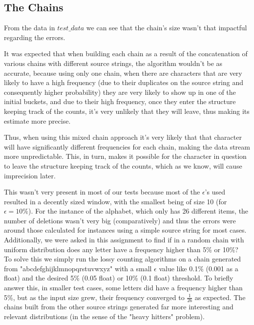 \documentclass[...]{revdetua}
\begin{document}
\subsection{The Chains}
From the data in $test\_data$ we can see that the chain's size wasn't that impactful regarding the errors.\par
It was expected that when building each chain as a result of the concatenation of various chains with different source strings, the algorithm wouldn't be as accurate, because using only one chain, when there are characters that are very likely to have a high frequency (due to their duplicates on the source string and consequently higher probability) they are very likely to show up in one of the initial buckets, and due to their high frequency, once they enter the structure keeping track of the counts, it's very unlikely that they will leave, thus making its estimate more precise.\par 
Thus, when using this mixed chain approach it's very likely that that character will have significantly different frequencies for each chain, making the data stream more unpredictable. This, in turn, makes it possible for the character in question to leave the structure keeping track of the counts, which as we know, will cause imprecision later.\par
This wasn't very present in most of our tests because most of the $\epsilon$'s used resulted in a decently sized window, with the smallest being of size 10 (for $\epsilon=10\%$). For the instance of the alphabet, which only has 26 different items, the number of deletions wasn't very big (comparatively) and thus the errors were around those calculated for instances using  a simple source string for most cases.\\
Additionally, we were asked in this assignment to find if in a random chain with uniform distribution does any letter have a frequency higher than 5\% or 10\%?\\
To solve this we simply run the lossy counting algorithms on a chain generated from "abcdefghijklmnopqrstuvwxyz" with a small $\epsilon$ value like 0.1\% (0.001 as a float) and the desired 5\% (0.05 float) or 10\% (0.1 float) threshold.
To briefly answer this, in smaller test cases, some letters did have a frequency higher than 5\%, but as the input size grew, their frequency converged to $\frac{1}{26}$ as expected.
The chains built from the other source strings generated far more interesting and relevant distributions (in the sense of the "heavy hitters" problem). 
\end{document}
